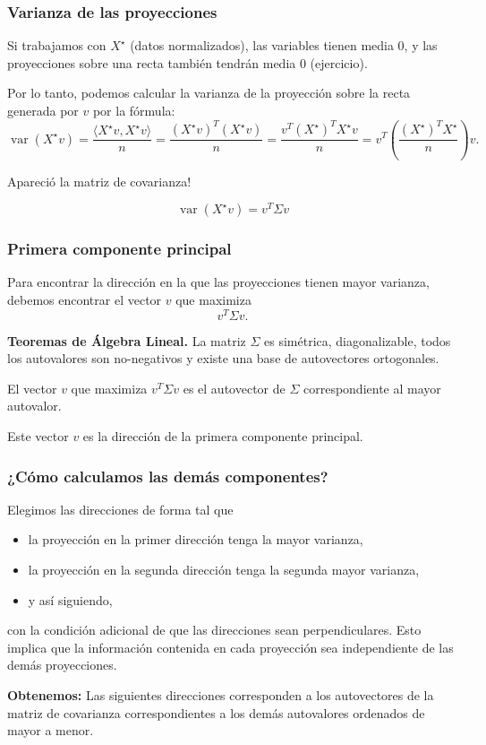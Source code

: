 \documentclass[aspectratio=169,12pt]{beamer}
\DeclareMathOperator{\var}{var}
\begin{document}
\begin{frame}
\frametitle{Varianza de las proyecciones}

Si trabajamos con $X^\star$ (datos normalizados), las variables tienen media 0, y las proyecciones sobre una recta también tendrán media 0 (ejercicio).

Por lo tanto, podemos calcular la varianza de la proyección sobre la recta generada por $v$ por la fórmula:
$$
\var(X^\star v) = \frac{\langle X^\star v, X^\star v \rangle}{n} = \frac{(X^\star v)^T (X^\star v)}{n} = \frac{v^T (X^\star)^T X^\star v}{n} = v^T \left(\frac{(X^\star)^T X^\star}{n}\right) v.
$$

Apareció la matriz de covarianza!

$$
\var(X^\star v) = v^T \Sigma v
$$

\end{frame}

\begin{frame}
\frametitle{Primera componente principal}

Para encontrar la dirección en la que las proyecciones tienen mayor varianza, debemos encontrar el vector $v$ que maximiza
$$v^T \Sigma v.$$

\textbf{Teoremas de Álgebra Lineal.} La matriz $\Sigma$ es simétrica, diagonalizable, todos los autovalores son no-negativos y existe una base de autovectores ortogonales.

El vector $v$ que maximiza $v^T \Sigma v$ es el autovector de $\Sigma$ correspondiente al mayor autovalor.

Este vector $v$ es la dirección de la primera componente principal.

\end{frame}

\begin{frame}
\frametitle{¿Cómo calculamos las demás componentes?}

Elegimos las direcciones de forma tal que 
\begin{itemize}
\item la proyección en la primer dirección tenga la mayor varianza, 
\item la proyección en la segunda dirección tenga la segunda mayor varianza, 
\item y así siguiendo,
\end{itemize}
con la condición adicional de que las direcciones sean perpendiculares. Esto implica que la información contenida en cada proyección sea independiente de las demás proyecciones.

\textbf{Obtenemos:} Las siguientes direcciones corresponden a los autovectores de la matriz de covarianza correspondientes a los demás autovalores ordenados de mayor a menor.

\end{frame}
\end{document}
